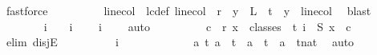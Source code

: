 \begin{isabellebody}
\ fastforce\isanewline
\ \ \ \ \ \ \isamarkupfalse%
\ \isamarkupfalse%
\ linecol\ \ lc{\isacharunderscore}{\kern0pt}def{\isacharcolon}{\kern0pt}\ {\isachardoublequoteopen}linecol\ {\isacharless}{\kern0pt}\ r\ {\isasymand}\ {\isacharparenleft}{\kern0pt}{\isasymforall}y\ {\isasymin}\ L{\isacharprime}{\kern0pt}\ {\isacharbackquote}{\kern0pt}\ {\isacharbraceleft}{\kern0pt}{\isachardot}{\kern0pt}{\isachardot}{\kern0pt}{\isacharless}{\kern0pt}t{\isacharbraceright}{\kern0pt}{\isachardot}{\kern0pt}\ {\isasymchi}\ y\ {\isacharequal}{\kern0pt}\ linecol{\isacharparenright}{\kern0pt}{\isachardoublequoteclose}\ \isamarkupfalse%
\ blast\isanewline
\ \ \ \ \ \ \isamarkupfalse%
\ {\isachardoublequoteopen}i\ {\isacharequal}{\kern0pt}\ {}\ {\isasymor}\ i\ {\isacharequal}{\kern0pt}\ {}{\isachardoublequoteclose}\ \isamarkupfalse%
\ {\isacartoucheopen}i\ {\isasymle}\ {}{\isacartoucheclose}\ \isamarkupfalse%
\ auto\isanewline
\ \ \ \ \ \ \isamarkupfalse%
\ \isamarkupfalse%
\ {\isachardoublequoteopen}{\isasymexists}c\ {\isacharless}{\kern0pt}\ r{\isachardot}{\kern0pt}\ {\isacharparenleft}{\kern0pt}{\isasymforall}x\ {\isasymin}\ classes\ {}\ t\ i{\isachardot}{\kern0pt}\ {\isasymchi}\ {\isacharparenleft}{\kern0pt}S{}\ x{\isacharparenright}{\kern0pt}\ {\isacharequal}{\kern0pt}\ c{\isacharparenright}{\kern0pt}{\isachardoublequoteclose}\isanewline
\ \ \ \ \ \ \isamarkupfalse%
\ {\isacharparenleft}{\kern0pt}elim\ disjE{\isacharparenright}{\kern0pt}\isanewline
\ \ \ \ \ \ \ \ \isamarkupfalse%
\ {\isachardoublequoteopen}i\ {\isacharequal}{\kern0pt}\ {}{\isachardoublequoteclose}\isanewline
\ \ \ \ \ \ \ \ \isamarkupfalse%
\ {\isacharasterisk}{\kern0pt}{\isacharcolon}{\kern0pt}\ {\isachardoublequoteopen}{\isasymforall}a\ t{\isachardot}{\kern0pt}\ a\ {\isasymin}\ {\isacharbraceleft}{\kern0pt}{\isachardot}{\kern0pt}{\isachardot}{\kern0pt}{\isacharless}{\kern0pt}t{\isacharplus}{\kern0pt}{}{\isacharbraceright}{\kern0pt}\ {\isasymand}\ a\ {\isasymnoteq}\ t\ {\isasymlongleftrightarrow}\ a\ {\isasymin}\ {\isacharbraceleft}{\kern0pt}{\isachardot}{\kern0pt}{\isachardot}{\kern0pt}{\isacharless}{\kern0pt}{\isacharparenleft}{\kern0pt}t{\isacharcolon}{\kern0pt}{\isacharcolon}{\kern0pt}nat{\isacharparenright}{\kern0pt}{\isacharbraceright}{\kern0pt}{\isachardoublequoteclose}\ \isamarkupfalse%
\ auto\isanewline

\end{isabellebody}
